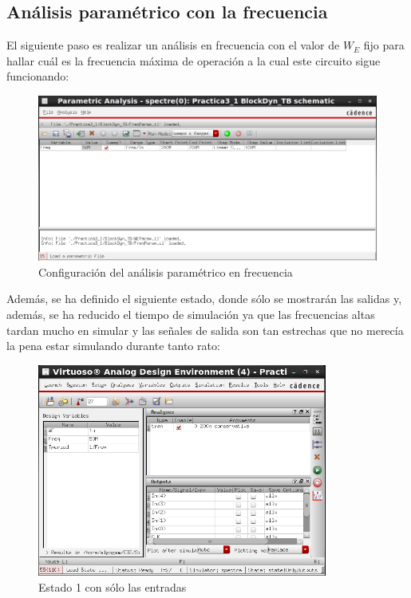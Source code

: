 \subsection{Análisis paramétrico con la frecuencia}
El siguiente paso es realizar un análisis en frecuencia con el valor de $W_E$ fijo para hallar cuál es la frecuencia máxima de operación a la cual este circuito sigue funcionando:
\begin{figure}[H]%
\begin {center}
\includegraphics[width=1\textwidth]{figures/FreqParamConfig.PNG}
\caption{Configuración del análisis paramétrico en frecuencia}
\label{fig:ConfigFreqParam}
\end {center}
\end{figure} 
Además, se ha definido el siguiente estado, donde sólo se mostrarán las salidas y, además, se ha reducido el tiempo de simulación ya que las frecuencias altas tardan mucho en simular y las señales de salida son tan estrechas que no merecía la pena estar simulando durante tanto rato:
\begin{figure}[H]%
\begin {center}
\includegraphics[width=0.85\textwidth]{figures/State1OnlyOutputsConfig.PNG}
\caption{Estado 1 con sólo las entradas}
\label{fig:ConfigState1OnlyOutputs}
\end {center}
\end{figure} 
